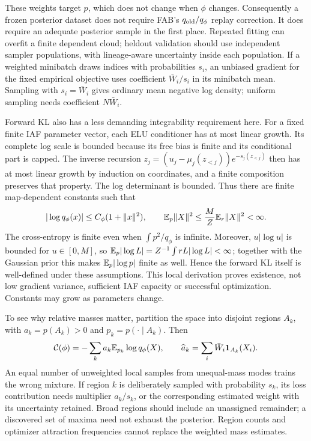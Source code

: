 These weights target $p$, which does not change when $\phi$ changes.
Consequently a frozen posterior dataset does not require FAB's
$q_{\rm old}/q_\phi$ replay correction. It does require an adequate posterior
sample in the first place. Repeated fitting can overfit a finite dependent
cloud; heldout validation should use independent sampler populations, with
lineage-aware uncertainty inside each population. If a weighted minibatch
draws indices with probabilities $s_i$, an unbiased gradient for the fixed
empirical objective uses coefficient $\bar W_i/s_i$ in its minibatch mean.
Sampling with $s_i=\bar W_i$ gives ordinary mean negative log density;
uniform sampling needs coefficient $N\bar W_i$.

Forward KL also has a less demanding integrability requirement here. For a
fixed finite IAF parameter vector, each ELU conditioner has at most linear
growth. Its complete log scale is bounded because its free bias is finite
and its conditional part is capped. The inverse recursion
$z_j=(u_j-\mu_j(z_{<j}))e^{-s_j(z_{<j})}$ then has at most linear growth by
induction on coordinates, and a finite composition preserves that property.
The log determinant is bounded. Thus there are finite map-dependent constants
such that
\begin{equation}
 |\log q_\phi(x)|\le C_\phi(1+\|x\|^2),\qquad
 \mathbb{E}_p\|X\|^2\le\frac{M}{Z}\mathbb{E}_r\|X\|^2<\infty.
 \label{eq:bf-is-fkl-finite}
\end{equation}
The cross-entropy is finite even when $\int p^2/q_\phi$ is infinite.
Moreover, $u|\log u|$ is bounded for $u\in[0,M]$, so
$\mathbb{E}_p|\log L|=Z^{-1}\int rL|\log L|<\infty$; together with the Gaussian
prior this makes $\mathbb{E}_p|\log p|$ finite as well. Hence the forward KL itself
is well-defined under these assumptions. This local derivation proves
existence, not low gradient variance, sufficient IAF capacity or successful
optimization. Constants may grow as parameters change.

To see why relative masses matter, partition the space into disjoint regions
$A_k$, with $a_k=p(A_k)>0$ and $p_k=p(\cdot\mid A_k)$. Then
\begin{equation}
 \mathcal C(\phi)=-\sum_k a_k\mathbb{E}_{p_k}\log q_\phi(X),\qquad
 \widehat a_k=\sum_i\bar W_i\mathbf1_{A_k}(X_i).
 \label{eq:bf-is-region-fkl}
\end{equation}
An equal number of unweighted local samples from unequal-mass modes trains
the wrong mixture. If region $k$ is deliberately sampled with probability
$s_k$, its loss contribution needs multiplier $a_k/s_k$, or the corresponding
estimated weight with its uncertainty retained. Broad regions should include
an unassigned remainder; a discovered set of maxima need not exhaust the
posterior. Region counts and optimizer attraction frequencies cannot replace
the weighted mass estimates.

